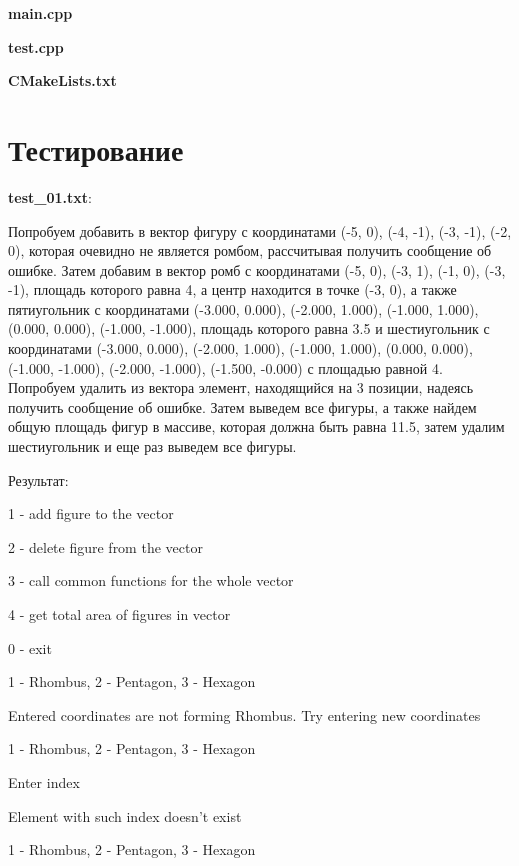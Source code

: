 \documentclass[a4paper, 12pt]{article}
\begin{document}
\vspace{3ex}
\textbf{\large{main.cpp}}


\vspace{3ex}
\textbf{\large{test.cpp}}


\vspace{3ex}
\textbf{\large{CMakeLists.txt}}

\newpage
\section{Тестирование}
\vspace{3ex}

\textbf{test\_01.txt}:

Попробуем добавить в вектор фигуру с координатами (-5, 0), (-4, -1), (-3, -1), (-2, 0), которая очевидно не является ромбом, рассчитывая получить сообщение об ошибке. Затем добавим в вектор ромб с координатами (-5, 0), (-3, 1), (-1, 0), (-3, -1), площадь которого равна 4, а центр находится в точке (-3, 0), а также пятиугольник с координатами (-3.000, 0.000), (-2.000, 1.000), (-1.000, 1.000), (0.000, 0.000), (-1.000, -1.000), площадь которого равна 3.5 и шестиугольник с координатами
(-3.000, 0.000), (-2.000, 1.000), (-1.000, 1.000), (0.000, 0.000), (-1.000, -1.000), (-2.000, -1.000), (-1.500, -0.000) с площадью равной 4. Попробуем удалить из вектора элемент, находящийся на 3 позиции, надеясь получить сообщение об ошибке. Затем выведем все фигуры, а также найдем общую площадь фигур в массиве, которая должна быть равна 11.5, затем удалим шестиугольник и еще раз выведем все фигуры.

Результат:

1 - add figure to the vector

2 - delete figure from the vector

3 - call common functions for the whole vector

4 - get total area of figures in vector

0 - exit

1 - Rhombus, 2 - Pentagon, 3 - Hexagon

Entered coordinates are not forming Rhombus. Try entering new coordinates

1 - Rhombus, 2 - Pentagon, 3 - Hexagon

Enter index

Element with such index doesn't exist

1 - Rhombus, 2 - Pentagon, 3 - Hexagon
\end{document}
